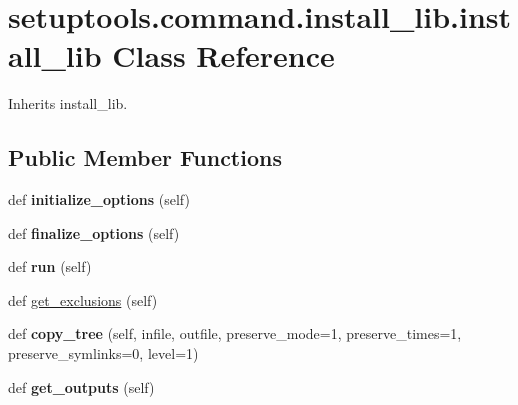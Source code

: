 \hypertarget{classsetuptools_1_1command_1_1install__lib_1_1install__lib}{}\section{setuptools.\+command.\+install\+\_\+lib.\+install\+\_\+lib Class Reference}
\label{classsetuptools_1_1command_1_1install__lib_1_1install__lib}


Inherits install\+\_\+lib.

\subsection*{Public Member Functions}
\begin{DoxyCompactItemize}
\item 
\mbox{\label{classsetuptools_1_1command_1_1install__lib_1_1install__lib_a8fc0f93e5b5e3a4cb8d43fee0610b1b7}} 
def {\bfseries initialize\+\_\+options} (self)
\item 
\mbox{\label{classsetuptools_1_1command_1_1install__lib_1_1install__lib_aac1fac327db9516f8a54507e5d778834}} 
def {\bfseries finalize\+\_\+options} (self)
\item 
\mbox{\label{classsetuptools_1_1command_1_1install__lib_1_1install__lib_a72adda63714aa1fdf24bdf6e6a5ca9f3}} 
def {\bfseries run} (self)
\item 
def \hyperlink{classsetuptools_1_1command_1_1install__lib_1_1install__lib_ac58d2f853233f9d3401b5f33617e5ac9}{get\+\_\+exclusions} (self)
\item 
\mbox{\label{classsetuptools_1_1command_1_1install__lib_1_1install__lib_a19149c83c5ca910718d921d2115af153}} 
def {\bfseries copy\+\_\+tree} (self, infile, outfile, preserve\+\_\+mode=1, preserve\+\_\+times=1, preserve\+\_\+symlinks=0, level=1)
\item 
\mbox{\label{classsetuptools_1_1command_1_1install__lib_1_1install__lib_ad4d991a596e53854926b93293b5b48ca}} 
def {\bfseries get\+\_\+outputs} (self)
\end{DoxyCompactItemize}
